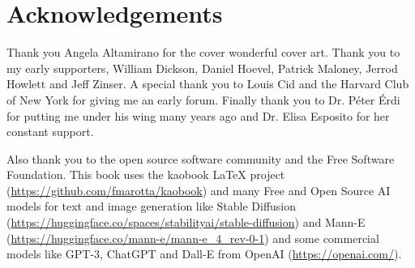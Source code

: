 \let\cleardoublepage\clearpage
\chapter*{Acknowledgements}

Thank you Angela Altamirano for the cover wonderful cover art. Thank you to my early supporters, William Dickson, Daniel Hoevel, Patrick Maloney, Jerrod Howlett and Jeff Zinser. A special thank you to Louis Cid and the Harvard Club of New York for giving me an early forum. Finally thank you to Dr. Péter Érdi for putting me under his wing many years ago and Dr. Elisa Esposito for her constant support. 

Also thank you to the open source software community and the Free Software Foundation. This book uses the kaobook LaTeX project (\url{https://github.com/fmarotta/kaobook}) and  many Free and Open Source AI  models for text and image generation like Stable Diffusion (\url{https://huggingface.co/spaces/stabilityai/stable-diffusion}) and Mann-E (\url{https://huggingface.co/mann-e/mann-e_4_rev-0-1}) and some commercial models like GPT-3, ChatGPT and Dall-E from OpenAI (\url{https://openai.com/}).

